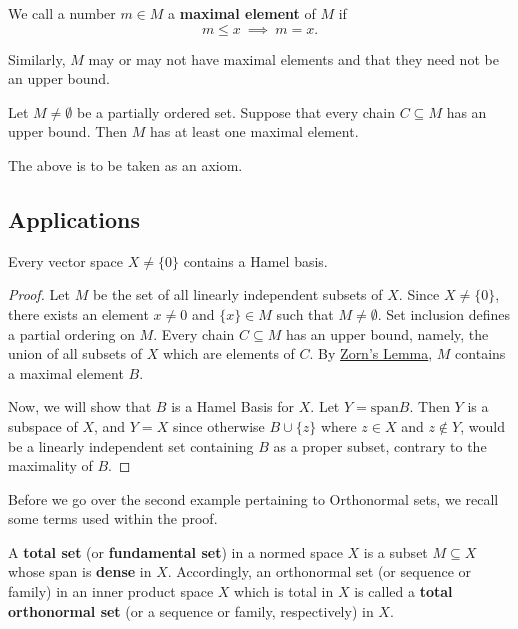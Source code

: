 \begin{definition}
    We call a number \( m \in M  \) a \textbf{maximal element} of \( M  \) if 
    \[  m \leq x \  \implies \ m = x.  \]
\end{definition}

Similarly, \( M  \) may or may not have maximal elements and that they need not be an upper bound.

\begin{theorem}\label{Zorn's Lemma}
    Let \( M \neq \emptyset \) be a partially ordered set. Suppose that every chain \( C \subseteq  M  \) has an upper bound. Then \( M  \) has at least one maximal element.
\end{theorem}

The above is to be taken as an axiom.

\subsection{Applications}

\begin{theorem}
   Every vector space \( X \neq \{  0  \}  \) contains a Hamel basis. 
\end{theorem}

\begin{proof}
    Let \( M  \) be the set of all linearly independent subsets of \( X  \). Since \( X \neq \{ 0  \}  \), there exists an element \( x \neq 0  \) and \( \{  x  \}  \in M  \) such that \( M \neq \emptyset \). Set inclusion defines a partial ordering on \( M  \). Every chain \( C \subseteq  M  \) has an upper bound, namely, the union of all subsets of \( X  \) which are elements of \( C  \). By {\hyperref[Zorn's Lemma]{Zorn's Lemma}}, \( M  \) contains a maximal element \( B  \). 

    Now, we will show that \( B  \) is a Hamel Basis for \( X  \). Let \( Y = \text{span}B  \). Then \( Y  \) is a subspace of \( X  \), and \( Y = X  \) since otherwise \( B \cup \{ z  \}   \) where \( z \in X  \) and \( z \notin Y  \), would be a linearly independent set containing \( B  \) as a proper subset, contrary to the maximality of \( B  \).
\end{proof}

Before we go over the second example pertaining to Orthonormal sets, we recall some terms used within the proof. 

\begin{definition}
    A \textbf{total set} (or \textbf{fundamental set}) in a normed space \( X  \) is a subset \( M \subseteq  X   \) whose span is \textbf{dense} in \( X  \). Accordingly, an orthonormal set (or sequence or family) in an inner product space \( X  \) which is total in \( X  \) is called a \textbf{total orthonormal set} (or a sequence or family, respectively) in \( X  \). 
\end{definition}


